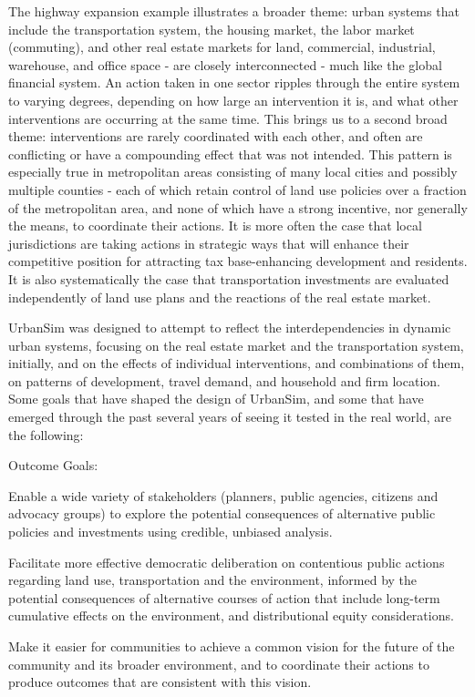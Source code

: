 The highway expansion example illustrates a broader theme: urban systems that include the transportation system, the housing market, the labor market (commuting), and other real estate markets for land, commercial, industrial, warehouse, and office space - are closely interconnected - much like the global financial system.  An action taken in one sector ripples through the entire system to varying degrees, depending on how large an intervention it is, and what other interventions are occurring at the same time.
This brings us to a second broad theme: interventions are rarely coordinated with each other, and often are conflicting or have a compounding effect that was not intended.  This pattern is especially true in metropolitan areas consisting of many local cities and possibly multiple counties - each of which retain control of land use policies over a fraction of the metropolitan area, and none of which have a strong incentive, nor generally the means, to coordinate their actions.  It is more often the case that local jurisdictions are taking actions in strategic ways that will enhance their competitive position for attracting tax base-enhancing development and residents.  It is also systematically the case that transportation investments are evaluated independently of land use plans and the reactions of the real estate market.

UrbanSim was designed to attempt to reflect the interdependencies in dynamic urban systems, focusing on the real estate market and the transportation system, initially, and on the effects of individual interventions, and combinations of them, on patterns of development, travel demand, and household and firm location.  Some goals that have shaped the design of UrbanSim, and some that have emerged through the past several years of seeing it tested in the real world, are the following:

Outcome Goals:
\squishlist
\item Enable a wide variety of stakeholders (planners, public agencies, citizens and advocacy groups) to explore the potential consequences of alternative public policies and investments using credible, unbiased analysis.
\item Facilitate more effective democratic deliberation on contentious public actions regarding land use, transportation and the environment, informed by the potential consequences of alternative courses of action that include long-term cumulative effects on the environment, and distributional equity considerations.
\item Make it easier for communities to achieve a common vision for the future of the community and its broader environment, and to coordinate their actions to produce outcomes that are consistent with this vision.
\squishend

